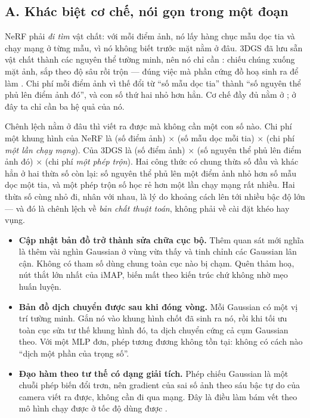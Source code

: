 \documentclass[../../deep_learning.tex]{subfiles}
\begin{document}
\subsection{A. Khác biệt cơ chế, nói gọn trong một đoạn}
NeRF phải \emph{đi tìm} vật chất: với mỗi điểm ảnh, nó lấy hàng chục mẫu dọc tia và chạy mạng ở từng mẫu, vì nó không biết trước mặt nằm ở đâu. 3DGS đã lưu sẵn vật chất thành các nguyên thể tường minh, nên nó chỉ cần : chiếu chúng xuống mặt ảnh, sắp theo độ sâu rồi trộn --- đúng việc mà phần cứng đồ hoạ sinh ra để làm \cite{kerbl20233dgs}. Chi phí mỗi điểm ảnh vì thế đổi từ ``số mẫu dọc tia'' thành ``số nguyên thể phủ lên điểm ảnh đó'', và con số thứ hai nhỏ hơn hẳn. Cơ chế đầy đủ nằm ở ; ở đây ta chỉ cần ba hệ quả của nó.

Chênh lệch nằm ở đâu thì viết ra được mà không cần một con số nào. Chi phí một khung hình của NeRF là (số điểm ảnh) \(\times\) (số mẫu dọc mỗi tia) \(\times\) (chi phí \emph{một lần chạy mạng}). Của 3DGS là (số điểm ảnh) \(\times\) (số nguyên thể phủ lên điểm ảnh đó) \(\times\) (chi phí \emph{một phép trộn}). Hai công thức có chung thừa số đầu và khác hẳn ở hai thừa số còn lại: số nguyên thể phủ lên một điểm ảnh nhỏ hơn số mẫu dọc một tia, và một phép trộn số học rẻ hơn một lần chạy mạng rất nhiều. Hai thừa số cùng nhỏ đi, nhân với nhau, là lý do khoảng cách lên tới nhiều bậc độ lớn --- và đó là chênh lệch về \emph{bản chất thuật toán}, không phải về cài đặt khéo hay vụng.

\begin{itemize}
\item \textbf{Cập nhật bản đồ trở thành sửa chữa cục bộ.} Thêm quan sát mới nghĩa là thêm vài nghìn Gaussian ở vùng vừa thấy và tinh chỉnh các Gaussian lân cận. Không có tham số dùng chung toàn cục nào bị chạm. Quên thảm hoạ, nút thắt lớn nhất của iMAP, biến mất theo kiến trúc chứ không nhờ mẹo huấn luyện.
\item \textbf{Bản đồ dịch chuyển được sau khi đóng vòng.} Mỗi Gaussian có một vị trí tường minh. Gắn nó vào khung hình chốt đã sinh ra nó, rồi khi tối ưu toàn cục sửa tư thế khung hình đó, ta dịch chuyển cứng cả cụm Gaussian theo. Với một MLP đơn, phép tương đương không tồn tại: không có cách nào ``dịch một phần của trọng số''.
\item \textbf{Đạo hàm theo tư thế có dạng giải tích.} Phép chiếu Gaussian là một chuỗi phép biến đổi trơn, nên gradient của sai số ảnh theo sáu bậc tự do của camera viết ra được, không cần đi qua mạng. Đây là điều làm bám vết theo mô hình chạy được ở tốc độ dùng được \cite{f32monogs2024}.
\end{itemize}
\end{document}
